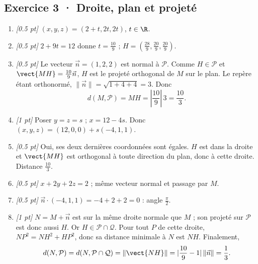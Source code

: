 \subsection*{Exercice 3 · Droite, plan et projeté}\begin{enumerate}

\item \textit{[\num{0,5} pt]} $(x,y,z)=(2+t,2t,2t)$, $t\in\R$.

\item \textit{[\num{0,5} pt]} $2+9t=12$ donne $t=\frac{10}{9}$ ; $H=(\frac{28}{9},\frac{20}{9},\frac{20}{9})$.

\item \textit{[\num{0,5} pt]} Le vecteur $\vec n=(1,2,2)$ est normal à $\mathcal P$. Comme $H\in\mathcal P$ et $\vect{MH}=\frac{10}{9}\vec n$, $H$ est le projeté orthogonal de $M$ sur le plan. Le repère étant orthonormé, $\|\vec n\|=\sqrt{1+4+4}=3$. Donc
\[d(M,\mathcal P)=MH=|\frac{10}{9}|\,3=\frac{10}{3}.\]

\item \textit{[1 pt]} Poser $y=z=s$ ; $x=12-4s$. Donc $(x,y,z)=(12,0,0)+s(-4,1,1)$.

\item \textit{[\num{0,5} pt]} Oui, ses deux dernières coordonnées sont égales. $H$ est dans la droite et $\vect{MH}$ est orthogonal à toute direction du plan, donc à cette droite. Distance $\frac{10}{3}$.

\item \textit{[\num{0,5} pt]} $x+2y+2z=2$ ; même vecteur normal et passage par $M$.

\item \textit{[\num{0,5} pt]} $\vec n\cdot(-4,1,1)=-4+2+2=0$ : angle $\frac{\pi}{2}$.

\item \textit{[1 pt]} $N=M+\vec n$ est sur la même droite normale que $M$ ; son projeté sur $\mathcal P$ est donc aussi $H$. Or $H\in\mathcal P\cap\mathcal Q$. Pour tout $P$ de cette droite, $NP^2=NH^2+HP^2$, donc sa distance minimale à $N$ est $NH$. Finalement,
\[d(N,\mathcal P)=d(N,\mathcal P\cap\mathcal Q)=\|\vect{NH}\|=|\frac{10}{9}-1|\,\|\vec n\|=\frac{1}{3}.\]

\end{enumerate}

